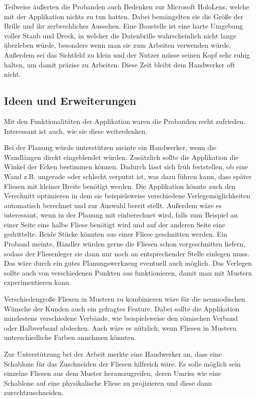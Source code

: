 Teilweise äußerten die Probanden auch Bedenken zur Microsoft HoloLens, welche mit der Applikation nichts zu tun hatten. Dabei bemängelten sie die Größe der Brille und ihr zerbrechliches Aussehen. Eine Baustelle ist eine harte Umgebung voller Staub und Dreck, in welcher die Datenbrille wahrscheinlich nicht lange überleben würde, besonders wenn man sie zum Arbeiten verwenden würde. Außerdem sei das Sichtfeld zu klein und der Nutzer müsse seinen Kopf sehr ruhig halten, um damit präzise zu Arbeiten. Diese Zeit bleibt dem Handwerker oft nicht. 

\subsection{Ideen und Erweiterungen}

Mit den Funktionalitäten der Applikation waren die Probanden recht zufrieden. Interessant ist auch, wie sie diese weiterdenken. 

Bei der Planung würde unterstützen meinte ein Handwerker, wenn die Wandlängen direkt eingeblendet würden. Zusätzlich sollte die Applikation die Winkel der Ecken bestimmen können. Dadurch lässt sich früh feststellen, ob eine Wand z.B. ungerade oder schlecht verputzt ist, was dazu führen kann, dass später Fliesen mit kleiner Breite benötigt werden. Die Applikation könnte auch den Verschnitt optimieren in dem sie beispielsweise verschiedene Verlegemöglichkeiten automatisch berechnet und zur Auswahl bereit stellt. Außerdem wäre es interessant, wenn in der Planung mit einberechnet wird, falls zum Beispiel an einer Seite eine halbe Fliese benötigt wird und auf der anderen Seite eine gedrittelte. Beide Stücke könnten aus einer Fliese geschnitten werden. Ein Proband meinte, Händler würden gerne die Fliesen schon vorgeschnitten liefern, sodass der Fliesenleger sie dann nur noch an entsprechender Stelle einlegen muss. Das wäre durch ein gutes Planungswerkzeug eventuell auch möglich. Das Verlegen sollte auch von verschiedenen Punkten aus funktionieren, damit man mit Mustern experimentieren kann.

Verschiedengroße Fliesen in Mustern zu kombinieren wäre für die neumodischen Wünsche der Kunden auch ein gefragtes Feature. Dabei sollte die Applikation mindestens verschiedene Verbände, wie beispielsweise den römischen Verband oder Halbverband abdecken. Auch wäre es nützlich, wenn Fliesen in Mustern unterschiedliche Farben annehmen könnten. 

Zur Unterstützung bei der Arbeit merkte eine Handwerker an, dass eine Schablone für das Zuschneiden der Fliesen hilfreich wäre. Es solle möglich sein einzelne Fliesen aus dem Muster herauszugreifen, deren Umriss wie eine Schablone auf eine physikalische Fliese zu projizieren und diese dann zurechtzuschneiden.

